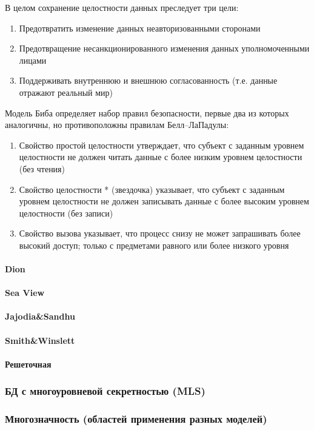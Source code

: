 В целом сохранение целостности данных преследует три цели:
\begin{enumerate}
    \item Предотвратить изменение данных неавторизованными сторонами
    \item Предотвращение несанкционированного изменения данных уполномоченными лицами
    \item Поддерживать внутреннюю и внешнюю согласованность (т.е. данные отражают реальный мир)
\end{enumerate}

Модель Биба определяет набор правил безопасности, первые два из которых аналогичны, но противоположны 
правилам Белл–ЛаПадулы:
\begin{enumerate}
    \item Свойство простой целостности утверждает, что субъект с заданным уровнем целостности не должен читать 
    данные с более низким уровнем целостности (без чтения)
    \item Свойство целостности * (звездочка) указывает, что субъект с заданным уровнем целостности не должен 
    записывать данные с более высоким уровнем целостности (без записи)
    \item Свойство вызова указывает, что процесс снизу не может запрашивать более высокий доступ; только с 
    предметами равного или более низкого уровня
\end{enumerate}

\paragraph{Dion}



\paragraph{Sea View}
\paragraph{Jajodia\&Sandhu}
\paragraph{Smith\&Winslett}
\paragraph{Решеточная}

\subsubsection{БД с многоуровневой секретностью (MLS)}
\subsubsection{Многозначность (областей применения разных моделей)}